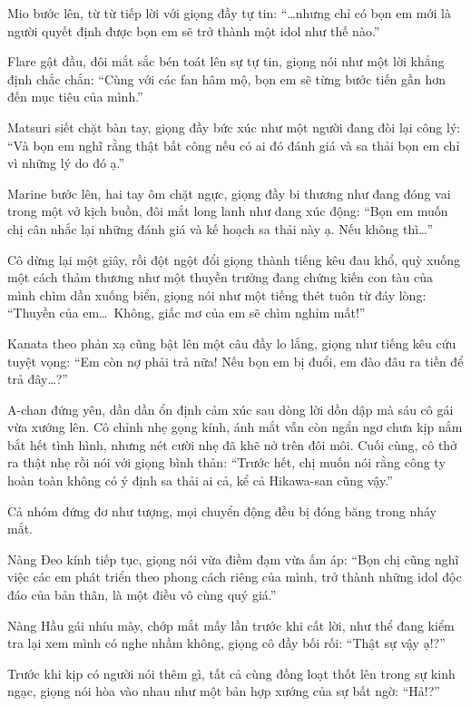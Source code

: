 \documentclass[../main.tex]{subfiles}
\begin{document}
Mio bước lên, từ từ tiếp lời với giọng đầy tự tin: ``\dots nhưng chỉ có bọn em mới là người quyết định được bọn em sẽ trở thành một idol như thế nào.''

Flare gật đầu, đôi mắt sắc bén toát lên sự tự tin, giọng nói như một lời khẳng định chắc chắn: ``Cùng với các fan hâm mộ, bọn em sẽ từng bước tiến gần hơn đến mục tiêu của mình.''

Matsuri siết chặt bàn tay, giọng đầy bức xúc như một người đang đòi lại công lý: ``Và bọn em nghĩ rằng thật bất công nếu có ai đó đánh giá và sa thải bọn em chỉ vì những lý do đó ạ.''

Marine bước lên, hai tay ôm chặt ngực, giọng đầy bi thương như đang đóng vai trong một vở kịch buồn, đôi mắt long lanh như đang xúc động: ``Bọn em muốn chị cân nhắc lại những đánh giá và kế hoạch sa thải này ạ. Nếu không thì\dots''

Cô dừng lại một giây, rồi đột ngột đổi giọng thành tiếng kêu đau khổ, quỳ xuống một cách thảm thương như một thuyền trưởng đang chứng kiến con tàu của mình chìm dần xuống biển, giọng nói như một tiếng thét tuôn từ đáy lòng: ``Thuyền của em\dots\ Không, giấc mơ của em sẽ chìm nghỉm mất!''

Kanata theo phản xạ cũng bật lên một câu đầy lo lắng, giọng như tiếng kêu cứu tuyệt vọng: ``Em còn nợ phải trả nữa! Nếu bọn em bị đuổi, em đào đâu ra tiền để trả đây\dots?''

A-chan đứng yên, dần dần ổn định cảm xúc sau dòng lời dồn dập mà sáu cô gái vừa xướng lên. Cô chỉnh nhẹ gọng kính, ánh mắt vẫn còn ngẩn ngơ chưa kịp nắm bắt hết tình hình, nhưng nét cười nhẹ đã khẽ nở trên đôi môi. Cuối cùng, cô thở ra thật nhẹ rồi nói với giọng bình thản: ``Trước hết, chị muốn nói rằng công ty hoàn toàn không có ý định sa thải ai cả, kể cả Hikawa-san cũng vậy.''

Cả nhóm đứng đơ như tượng, mọi chuyển động đều bị đóng băng trong nháy mắt.

Nàng Đeo kính tiếp tục, giọng nói vừa điềm đạm vừa ấm áp: ``Bọn chị cũng nghĩ việc các em phát triển theo phong cách riêng của mình, trở thành những idol độc đáo của bản thân, là một điều vô cùng quý giá.''

Nàng Hầu gái nhíu mày, chớp mắt mấy lần trước khi cất lời, như thể đang kiểm tra lại xem mình có nghe nhầm không, giọng cô đầy bối rối: ``Thật sự vậy ạ!?''

Trước khi kịp có người nói thêm gì, tất cả cùng đồng loạt thốt lên trong sự kinh ngạc, giọng nói hòa vào nhau như một bản hợp xướng của sự bất ngờ: ``Hả!?''
\end{document}
